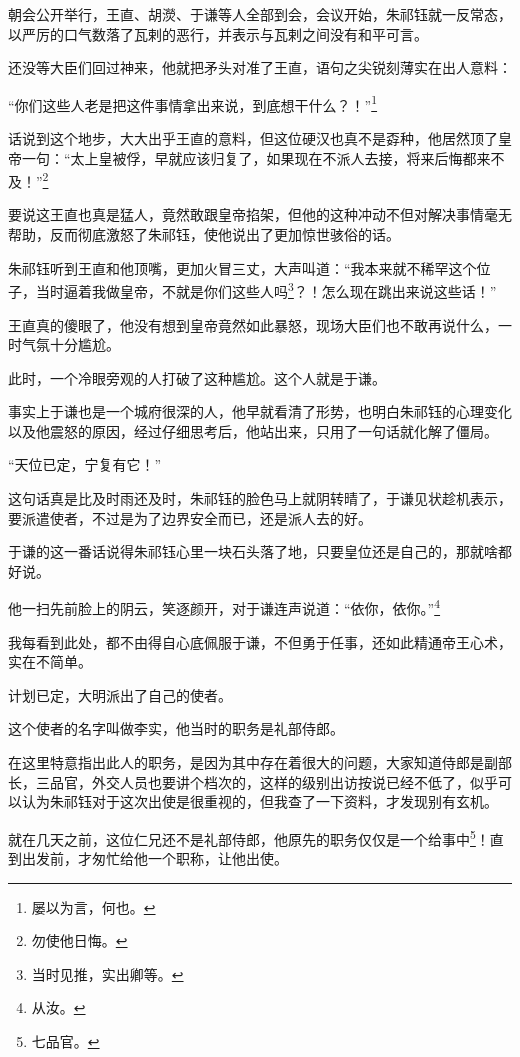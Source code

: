 \begin{multicols}{\theparacolNo}
朝会公开举行，王直、胡濙、于谦等人全部到会，会议开始，朱祁钰就一反常态，以严厉的口气数落了瓦剌的恶行，并表示与瓦剌之间没有和平可言。

还没等大臣们回过神来，他就把矛头对准了王直，语句之尖锐刻薄实在出人意料：

“你们这些人老是把这件事情拿出来说，到底想干什么？！”\footnote{屡以为言，何也。}

话说到这个地步，大大出乎王直的意料，但这位硬汉也真不是孬种，他居然顶了皇帝一句：“太上皇被俘，早就应该归复了，如果现在不派人去接，将来后悔都来不及！”\footnote{勿使他日悔。}

要说这王直也真是猛人，竟然敢跟皇帝掐架，但他的这种冲动不但对解决事情毫无帮助，反而彻底激怒了朱祁钰，使他说出了更加惊世骇俗的话。

朱祁钰听到王直和他顶嘴，更加火冒三丈，大声叫道：“我本来就不稀罕这个位子，当时逼着我做皇帝，不就是你们这些人吗\footnote{当时见推，实出卿等。}？！怎么现在跳出来说这些话！”

王直真的傻眼了，他没有想到皇帝竟然如此暴怒，现场大臣们也不敢再说什么，一时气氛十分尴尬。

此时，一个冷眼旁观的人打破了这种尴尬。这个人就是于谦。

事实上于谦也是一个城府很深的人，他早就看清了形势，也明白朱祁钰的心理变化以及他震怒的原因，经过仔细思考后，他站出来，只用了一句话就化解了僵局。

“天位已定，宁复有它！”

这句话真是比及时雨还及时，朱祁钰的脸色马上就阴转晴了，于谦见状趁机表示，要派遣使者，不过是为了边界安全而已，还是派人去的好。

于谦的这一番话说得朱祁钰心里一块石头落了地，只要皇位还是自己的，那就啥都好说。

他一扫先前脸上的阴云，笑逐颜开，对于谦连声说道：“依你，依你。”\footnote{从汝。}

我每看到此处，都不由得自心底佩服于谦，不但勇于任事，还如此精通帝王心术，实在不简单。

计划已定，大明派出了自己的使者。

这个使者的名字叫做李实，他当时的职务是礼部侍郎。

在这里特意指出此人的职务，是因为其中存在着很大的问题，大家知道侍郎是副部长，三品官，外交人员也要讲个档次的，这样的级别出访按说已经不低了，似乎可以认为朱祁钰对于这次出使是很重视的，但我查了一下资料，才发现别有玄机。

就在几天之前，这位仁兄还不是礼部侍郎，他原先的职务仅仅是一个给事中\footnote{七品官。}！直到出发前，才匆忙给他一个职称，让他出使。


\end{multicols}
